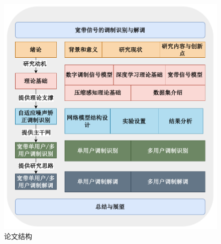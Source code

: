 \begin{figure}[htbp]
    \centering
    \includegraphics[width=\textwidth]{Image/chap1_overallstructure.pdf}
    \caption{论文结构}
    \label{fig:thesis_structure}
\end{figure}
